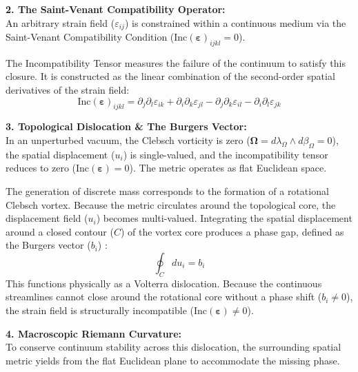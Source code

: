\textbf{2. The Saint-Venant Compatibility Operator:} \\
An arbitrary strain field ($\varepsilon_{ij}$) is constrained within a continuous medium via the Saint-Venant Compatibility Condition ($\text{Inc}(\boldsymbol{\varepsilon})_{ijkl} = 0$). 

The Incompatibility Tensor measures the failure of the continuum to satisfy this closure. It is constructed as the linear combination of the second-order spatial derivatives of the strain field: 
\begin{equation}
    \text{Inc}(\boldsymbol{\varepsilon})_{ijkl} = \partial_j \partial_l \varepsilon_{ik} + \partial_i \partial_k \varepsilon_{jl} - \partial_j \partial_k \varepsilon_{il} - \partial_i \partial_l \varepsilon_{jk} 
\end{equation}

\textbf{3. Topological Dislocation \& The Burgers Vector:} \\
In an unperturbed vacuum, the Clebsch vorticity is zero ($\boldsymbol{\Omega} = d\lambda_\Omega \wedge d\beta_\Omega = 0$), the spatial displacement ($u_i$) is single-valued, and the incompatibility tensor reduces to zero ($\text{Inc}(\boldsymbol{\varepsilon}) = 0$). The metric operates as flat Euclidean space.

The generation of discrete mass corresponds to the formation of a rotational Clebsch vortex. Because the metric circulates around the topological core, the displacement field ($u_i$) becomes multi-valued. Integrating the spatial displacement around a closed contour ($C$) of the vortex core produces a phase gap, defined as the Burgers vector ($b_i$) \cite{Nye1953}: 
\begin{equation}
    \oint_C d u_i = b_i 
\end{equation}
This functions physically as a Volterra dislocation. Because the continuous streamlines cannot close around the rotational core without a phase shift ($b_i \neq 0$), the strain field is structurally incompatible ($\text{Inc}(\boldsymbol{\varepsilon}) \neq 0$).

\textbf{4. Macroscopic Riemann Curvature:} \\
To conserve continuum stability across this dislocation, the surrounding spatial metric yields from the flat Euclidean plane to accommodate the missing phase. 

